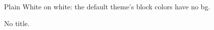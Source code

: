 \documentclass{beamer}
\begin{document}
\begin{frame}
\begin{block}{Plain}
White on white: the default theme's block colors have no bg.
\end{block}
\begin{block}{}
No title.
\end{block}
\end{frame}
\end{document}
